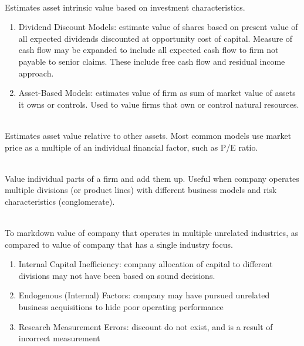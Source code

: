 \begin{method} \\
Estimates asset intrinsic value based on investment characteristics.
\begin{enumerate}[label=\roman*.]
\setlength{\itemsep}{0pt}
\item Dividend Discount Models: estimate value of shares based on present value of all expected dividends discounted at opportunity cost of capital. Measure of cash flow may be expanded to include all expected cash flow to firm not payable to senior claims. These include free cash flow and residual income approach.
\item Asset-Based Models: estimates value of firm as sum of market value of assets it owns or controls. Used to value firms that own or control natural resources.
\end{enumerate}
\end{method}

\begin{method} \\
Estimates asset value relative to other assets. Most common models use market price as a multiple of an individual financial factor, such as P/E ratio.
\end{method}

\begin{method} \\
Value individual parts of a firm and add them up. Useful when company operates multiple divisions (or product lines) with different business models and risk characteristics (conglomerate).	
\end{method}

\begin{remark} \\
To markdown value of company that operates in multiple unrelated industries, as compared to value of company that has a single industry focus.
\begin{enumerate}[label=\roman*.]
\setlength{\itemsep}{0pt}
\item Internal Capital Inefficiency: company allocation of capital to different divisions may not have been based on sound decisions.
\item Endogenous (Internal) Factors: company may have pursued unrelated business acquisitions to hide poor operating performance
\item Research Measurement Errors: discount do not exist, and is a result of incorrect measurement
\end{enumerate}
\end{remark}

